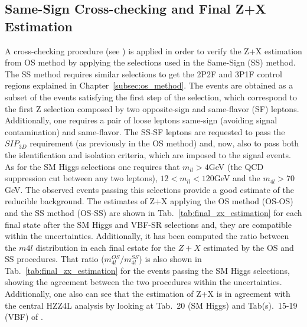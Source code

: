 \subsection{Same-Sign Cross-checking and Final Z+X Estimation}
A cross-checking procedure (see \cite{bib:CMS-HIG-13-002,bib:CMS-AN-16-328}) is applied in order to verify the Z+X estimation from OS method by applying the selections used in the Same-Sign (SS) method. The SS method requires similar selections to get the 2P2F and 3P1F control regions explained in Chapter~\ref{subsec:os_method}. The events are obtained as a subset of the events satisfying the first step of the selection, which correspond to the first Z selection composed by two opposite-sign and same-flavor (SF) leptons. Additionally, one requires a pair of loose leptons same-sign (avoiding signal contamination) and same-flavor. The SS-SF leptons are requested to pass the $SIP_{3D}$ requirement (as previously in the OS method) and, now, also to pass both the identification and isolation criteria, which are imposed to the signal events. As for the SM Higgs selections one requires that $m_{ll} > 4$GeV (the QCD suppression cut between any two leptons), $12 < m_{ll} < 120$GeV and the $m_{4l} > 70$GeV. The observed events passing this selections provide a good estimate of the reducible background. The estimates of Z+X applying the OS method (OS-OS) and the SS method (OS-SS) are shown in Tab.~\ref{tab:final_zx_estimation} for each final state after the SM Higgs and VBF-SR selections and, they are compatible within the uncertainties. Additionally, it has been computed the ratio between the $m4l$ distribution in each final estate for the $Z+X$ estimated by the OS and SS procedures. That ratio ($m_{4l}^{OS}/m_{4l}^{SS}$) is also shown in Tab.~\ref{tab:final_zx_estimation} for the events passing the SM Higgs selections, showing the agreement between the two procedures within the uncertainties. Additionally, one also can see that the estimation of Z+X is in agreement with the central HZZ4L analysis by looking at Tab.~20 (SM Higgs) and Tab(s).~15-19 (VBF) of \cite{bib:CMS-AN-16-442}.

